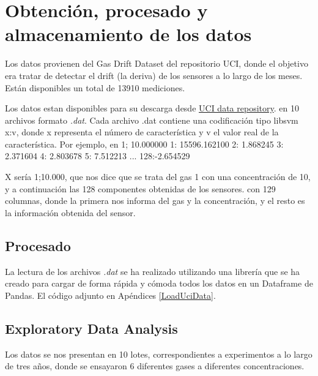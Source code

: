 \chapter{Obtención, procesado y almacenamiento de los datos}

Los datos provienen del Gas Drift Dataset del repositorio UCI, 
donde el objetivo era tratar de detectar el drift (la deriva) de los sensores a lo largo de los meses. Están disponibles un total de 13910 mediciones. 

Los datos estan disponibles para su descarga desde
\href{https://archive.ics.uci.edu/ml//datasets/Gas+Sensor+Array+Drift+Dataset#}{UCI data repository}.
en 10 archivos formato \emph{.dat}. Cada archivo .dat contiene una codificación tipo libsvm x:v,
 donde x representa el número de característica y v el valor real de la característica. 
 Por ejemplo, en 1; 10.000000 1: 15596.162100 2: 1.868245 3: 2.371604 4: 2.803678 5: 7.512213 ... 128:-2.654529

X sería 1;10.000, que nos dice que se trata del gas 1 con una concentración de 10, y a continuación las 128 componentes obtenidas de los sensores.
con 129 columnas,
donde la primera nos informa del gas y la concentración, y el resto es la información obtenida del sensor.

\section{Procesado}

La lectura de los archivos \emph{.dat} se ha realizado utilizando una librería que se ha creado para cargar de forma rápida y cómoda todos los datos en un Dataframe de Pandas. El código adjunto en Apéndices \ref{LoadUciData}.

\section{Exploratory Data Analysis}

Los datos se nos presentan en 10 lotes, correspondientes a experimentos a lo largo de tres años, donde se ensayaron 6 diferentes gases a diferentes concentraciones.

